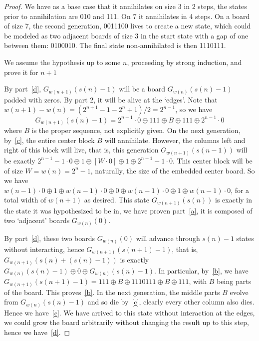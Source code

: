 \documentclass[12pt,letterpaper]{article}
\begin{document}
\begin{proof}
We have as a base case that it annihilates on size 3 in 2 steps, the states prior to annihilation are 010 and 111. On 7 it annihilates in 4 steps. On a board of size 7, the second generation, 0011100 lives to create a new state, which could be modeled as two adjacent boards of size 3 in the start state with a gap of one between them: 0100010. The final state non-annihilated is then 1110111.

We assume the hypothesis up to some $n$, proceeding by strong induction, and prove it for $n+1$

By part~\ref{d}, $G_{w(n+1)}(s(n)-1)$ will be a board $G_{w(n)}(s(n)-1)$ padded with zeros. By part 2, it will be alive at the `edges'. Note that $w(n+1)-w(n)=(2^{n+1}-1-2^{n}+1)/2=2^{n-1}$, so we have
$$G_{w(n+1)}(s(n)-1) = 2^{n-1}\cdot 0 \oplus 111 \oplus B \oplus 111 \oplus 2^{n-1}\cdot 0$$
where $B$ is the proper sequence, not explicitly given. On the next generation, by~\ref{c}, the entire center block $B$ will annihilate. However, the columns left and right of this block will live, that is, this generation $G_{w(n+1)}(s(n-1))$ will be exactly $2^{n-1}-1\cdot 0 \oplus 1 \oplus [W\cdot 0]\oplus 1 \oplus 2^{n-1}-1\cdot 0$. This center block will be of size $W=w(n)=2^n-1$, naturally, the size of the embedded center board. So we have $w(n-1)\cdot 0\oplus 1 \oplus w(n-1)\cdot 0\oplus 0 \oplus w(n-1)\cdot 0\oplus 1\oplus w(n-1)\cdot 0$, for a total width of $w(n+1)$ as desired. This state $G_{w(n+1)}(s(n))$ is exactly in the state it was hypothesized to be in, we have proven part~\ref{a}, it is composed of two `adjacent' boards $G_{w(n)}(0)$.

By part~\ref{d}, these two boards $G_{w(n)}(0)$ will advance through $s(n)-1$ states without interacting, hence $G_{w(n+1)}(s(n+1)-1)$, that is, $G_{w(n+1)}(s(n)+(s(n)-1))$ is exactly $G_{w(n)}(s(n)-1) \oplus 0 \oplus G_{w(n)}(s(n)-1)$. In particular, by~\ref{b}, we have $G_{w(n+1)}(s(n+1)-1) = 111 \oplus B \oplus 1110111 \oplus B \oplus 111$, with $B$ being parts of the board. This proves~\ref{b}. In the next generation, the middle parts $B$ evolve from $G_{w(n)}(s(n)-1)$ and so die by~\ref{c}, clearly every other column also dies. Hence we have~\ref{c}. We have arrived to this state without interaction at the edges, we could grow the board arbitrarily without changing the result up to this step, hence we have~\ref{d}.

\end{proof}
\end{document}
